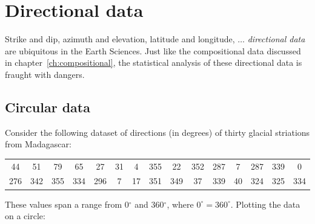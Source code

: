 \chapter{Directional data}
\label{ch:directional}

Strike and dip, azimuth and elevation, latitude and longitude,
$\ldots$ \textit{directional data} are ubiquitous in the Earth
Sciences. Just like the compositional data discussed in
chapter~\ref{ch:compositional}, the statistical analysis of these
directional data is fraught with dangers.

\section{Circular data}
\label{sec:circular}

Consider the following dataset of directions (in degrees) of thirty
glacial striations from Madagascar:

\begin{center}
\begin{tabular}{ccccccccccccccc}
44 & 51 & 79 & 65 & 27 & 31 & 4 & 355 & 22 & 352 & 287 & 7 & 287 & 339 & 0 \\
276 & 342 & 355 & 334 & 296 & 7 & 17 & 351 & 349 & 37 & 339 & 40 & 324 & 325 & 334\\
\end{tabular}
\end{center}

These values span a range from 0$^{\circ}$ and 360$^{\circ}$, where
$0^{\circ}=360^{\circ}$. Plotting the data on a circle:

